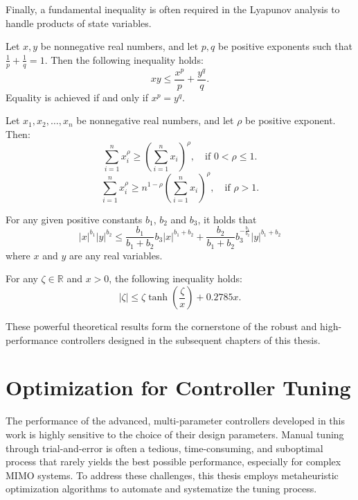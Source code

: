 Finally, a fundamental inequality is often required in the Lyapunov analysis to handle products of state variables.

\begin{lemma}  \label{lemma3}
Let \( x, y \) be nonnegative real numbers, and let \( p, q \) be positive exponents such that \( \frac{1}{p} + \frac{1}{q} = 1 \). Then the following inequality holds:
\[
    xy \leq \frac{x^p}{p} + \frac{y^q}{q}.
\]
Equality is achieved if and only if \( x^p = y^q \).
\end{lemma}

\begin{lemma} \label{lemma4}
Let \( x_1, x_2, \dots, x_n \) be nonnegative real numbers, and let \( \rho\) be positive exponent. Then:
\[
    \sum_{i=1}^{n} x_i^\rho \geq \left( \sum_{i=1}^{n} x_i \right)^\rho, \quad \text{if } 0 < \rho \leq 1.
\]
\[
    \sum_{i=1}^{n} x_i^\rho \geq n^{1-\rho} \left( \sum_{i=1}^{n} x_i \right)^\rho, \quad \text{if } \rho > 1.
\]
\end{lemma}

\begin{lemma} \label{lemma5}
For any given positive constants $b_1$, $b_2$ and $b_3$, it holds that
\[
    |x|^{b_1}|y|^{b_2} \leq \frac{b_1}{b_1 + b_2}b_3|x|^{b_1+b_2} + \frac{b_2}{b_1 + b_2}b_3^{-\frac{b_1}{b_2}}|y|^{b_1+b_2}
\]
where $x$ and $y$ are any real variables.
\end{lemma}


\begin{lemma}  \cite{tanh} \label{lemma6}
For any $\zeta \in \mathbb{R}$ and $x > 0$, the following inequality holds:
\[
    |\zeta| \leq \zeta\tanh\left(\frac{\zeta}{x}\right) + 0.2785x.
\]
\end{lemma}

These powerful theoretical results form the cornerstone of the robust and high-performance controllers designed in the subsequent chapters of this thesis.

\section{Optimization for Controller Tuning}
\label{sec:optimization}

The performance of the advanced, multi-parameter controllers developed in this work is highly sensitive to the choice of their design parameters. Manual tuning through trial-and-error is often a tedious, time-consuming, and suboptimal process that rarely yields the best possible performance, especially for complex MIMO systems. To address these challenges, this thesis employs metaheuristic optimization algorithms to automate and systematize the tuning process.

